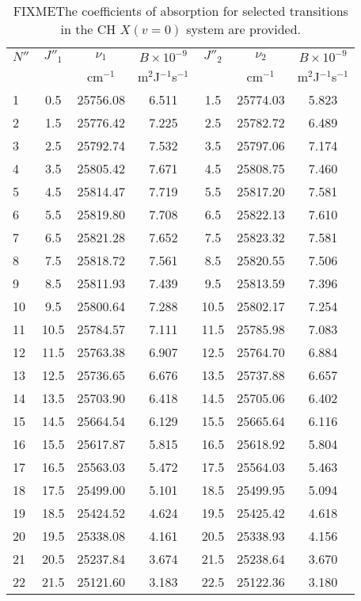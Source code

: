 \begin{table}
  \caption[Einstein B coefficientsFIXME]{FIXMEThe coefficients of absorption for selected transitions in the CH \(X(v=0)\) system are provided.}
  \begin{center}
    \begin{tabular}{lcccccc}
      \(N''\) & \(J''_1\) & \(\nu_1\) & \(B\times10^{-9}\) & \(J''_2\) & \(\nu_2\) & \(B\times10^{-9}\) \tabularnewline
        & & cm\(^{-1}\) & m\(^2\)J\(^{-1}\)s\(^{-1}\) & & cm\(^{-1}\) & m\(^2\)J\(^{-1}\)s\(^{-1}\) \tabularnewline
      \hline\hline
      1  & 0.5  & 25756.08 & 6.511 & 1.5  & 25774.03 & 5.823 \tabularnewline
      2  & 1.5  & 25776.42 & 7.225 & 2.5  & 25782.72 & 6.489 \tabularnewline
      3  & 2.5  & 25792.74 & 7.532 & 3.5  & 25797.06 & 7.174 \tabularnewline
      4  & 3.5  & 25805.42 & 7.671 & 4.5  & 25808.75 & 7.460 \tabularnewline
      5  & 4.5  & 25814.47 & 7.719 & 5.5  & 25817.20 & 7.581 \tabularnewline
      6  & 5.5  & 25819.80 & 7.708 & 6.5  & 25822.13 & 7.610 \tabularnewline
      7  & 6.5  & 25821.28 & 7.652 & 7.5  & 25823.32 & 7.581 \tabularnewline
      8  & 7.5  & 25818.72 & 7.561 & 8.5  & 25820.55 & 7.506 \tabularnewline
      9  & 8.5  & 25811.93 & 7.439 & 9.5  & 25813.59 & 7.396 \tabularnewline
      10 & 9.5  & 25800.64 & 7.288 & 10.5 & 25802.17 & 7.254 \tabularnewline
      11 & 10.5 & 25784.57 & 7.111 & 11.5 & 25785.98 & 7.083 \tabularnewline
      12 & 11.5 & 25763.38 & 6.907 & 12.5 & 25764.70 & 6.884 \tabularnewline
      13 & 12.5 & 25736.65 & 6.676 & 13.5 & 25737.88 & 6.657 \tabularnewline
      14 & 13.5 & 25703.90 & 6.418 & 14.5 & 25705.06 & 6.402 \tabularnewline
      15 & 14.5 & 25664.54 & 6.129 & 15.5 & 25665.64 & 6.116 \tabularnewline
      16 & 15.5 & 25617.87 & 5.815 & 16.5 & 25618.92 & 5.804 \tabularnewline
      17 & 16.5 & 25563.03 & 5.472 & 17.5 & 25564.03 & 5.463 \tabularnewline
      18 & 17.5 & 25499.00 & 5.101 & 18.5 & 25499.95 & 5.094 \tabularnewline
      19 & 18.5 & 25424.52 & 4.624 & 19.5 & 25425.42 & 4.618 \tabularnewline
      20 & 19.5 & 25338.08 & 4.161 & 20.5 & 25338.93 & 4.156 \tabularnewline
      21 & 20.5 & 25237.84 & 3.674 & 21.5 & 25238.64 & 3.670 \tabularnewline
      22 & 21.5 & 25121.60 & 3.183 & 22.5 & 25122.36 & 3.180 \tabularnewline
      \hline
    \end{tabular}
  \end{center}
  \label{tab:absorptionLines}
\end{table}


